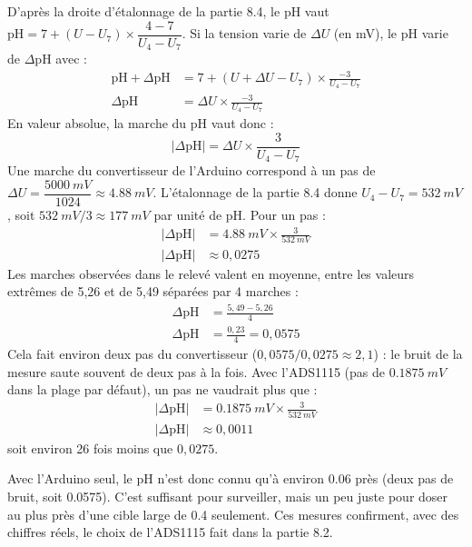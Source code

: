 \begin{demonstration}
D'après la droite d'étalonnage de la partie 8.4, le pH vaut $\mathrm{pH} = 7 + (U - U_7)\times\dfrac{4-7}{U_4 - U_7}$. Si la tension varie de $\Delta U$ (en mV), le pH varie de $\Delta\mathrm{pH}$ avec :
\begin{align*}
\mathrm{pH} + \Delta\mathrm{pH} &= 7 + (U + \Delta U - U_7)\times\frac{-3}{U_4 - U_7}\\
\Delta\mathrm{pH} &= \Delta U\times\frac{-3}{U_4 - U_7}
\end{align*}
En valeur absolue, la marche du pH vaut donc :
\[
\left|\Delta\mathrm{pH}\right| = \Delta U\times\frac{3}{U_4 - U_7}
\]
Une marche du convertisseur de l'Arduino correspond à un pas de $\Delta U = \dfrac{\qty{5000}{mV}}{1024} \approx \qty{4,88}{mV}$. L'étalonnage de la partie 8.4 donne $U_4 - U_7 = \qty{532}{mV}$, soit $\qty{532}{mV}/3 \approx \qty{177}{mV}$ par unité de pH. Pour un pas :
\begin{align*}
\left|\Delta\mathrm{pH}\right| &= \qty{4,88}{mV}\times\frac{3}{\qty{532}{mV}}\\
\left|\Delta\mathrm{pH}\right| &\approx 0{,}0275
\end{align*}
Les marches observées dans le relevé valent en moyenne, entre les valeurs extrêmes de 5,26 et de 5,49 séparées par 4 marches :
\begin{align*}
\Delta\mathrm{pH} &= \frac{5{,}49 - 5{,}26}{4}\\
\Delta\mathrm{pH} &= \frac{0{,}23}{4} = 0{,}0575
\end{align*}
Cela fait environ deux pas du convertisseur ($0{,}0575/0{,}0275 \approx 2{,}1$) : le bruit de la mesure saute souvent de deux pas à la fois. Avec l'ADS1115 (pas de $\qty{0,1875}{mV}$ dans la plage par défaut), un pas ne vaudrait plus que :
\begin{align*}
\left|\Delta\mathrm{pH}\right| &= \qty{0,1875}{mV}\times\frac{3}{\qty{532}{mV}}\\
\left|\Delta\mathrm{pH}\right| &\approx 0{,}0011
\end{align*}
soit environ 26 fois moins que $0{,}0275$.
\end{demonstration}

Avec l'Arduino seul, le pH n'est donc connu qu'à environ \num{0,06} près (deux pas de bruit, soit \num{0,0575}). C'est suffisant pour surveiller, mais un peu juste pour doser au plus près d'une cible large de \num{0,4} seulement. Ces mesures confirment, avec des chiffres réels, le choix de l'ADS1115 fait dans la partie 8.2.

